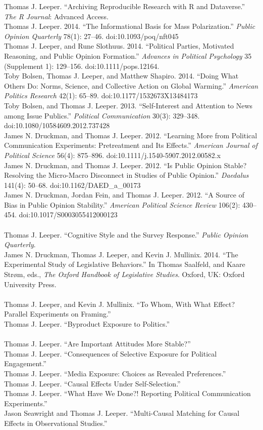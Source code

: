 \documentclass[12pt]{article}
\renewcommand{\section}[1]{\pagebreak[3]%
    \llap{\scshape\smash{\parbox[t]{\marginparwidth}{\raggedright {\color{lg}#1}}}}%
    \vspace{-\baselineskip}\par}
\newcommand{\topic}[1]{\pagebreak[3]\indent {\color{lg}{\footnotesize #1 }}\\}
\newcommand{\entry}[1]{\indent {\color{lg}\guillemotright}\hspace{2pt}#1\vspace{.25em}\\}
\begin{document}
\section{Peer-Reviewed Publications}
\entry{Thomas J. Leeper. ``Archiving Reproducible Research with R and Dataverse.'' {\em The R Journal}: Advanced Access.}
\entry{Thomas J. Leeper. 2014. ``The Informational Basis for Mass Polarization.'' {\em Public Opinion Quarterly} 78(1): 27--46. doi:10.1093/poq/nft045}
\entry{Thomas J. Leeper, and Rune Slothuus. 2014. ``Political Parties, Motivated Reasoning, and Public Opinion Formation.'' {\em Advances in Political Psychology} 35 (Supplement 1): 129--156. doi:10.1111/pops.12164.}
\entry{Toby Bolsen, Thomas J. Leeper, and Matthew Shapiro. 2014. ``Doing What Others Do: Norms, Science, and Collective Action on Global Warming.'' {\em American Politics Research} 42(1): 65--89. doi:10.1177/1532673X13484173}
\entry{Toby Bolsen, and Thomas J. Leeper. 2013. ``Self-Interest and Attention to News among Issue Publics.'' {\em Political Communication} 30(3): 329--348.\\ doi:10.1080/10584609.2012.737428}
\entry{James N. Druckman, and Thomas J. Leeper. 2012. ``Learning More from Political Communication Experiments: Pretreatment and Its Effects.'' {\em American Journal of Political Science} 56(4): 875--896. doi:10.1111/j.1540-5907.2012.00582.x}
\entry{James N. Druckman, and Thomas J. Leeper. 2012. ``Is Public Opinion Stable? Resolving the Micro-Macro Disconnect in Studies of Public Opinion.'' {\em Daedalus} 141(4): 50--68. doi:10.1162/DAED\_a\_00173}
\entry{James N. Druckman, Jordan Fein, and Thomas J. Leeper. 2012. ``A Source of Bias in Public Opinion Stability.'' {\em American Political Science Review} 106(2): 430--454. doi:10.1017/S0003055412000123}

\topic{Forthcoming}
\entry{Thomas J. Leeper. ``Cognitive Style and the Survey Response.'' {\em Public Opinion Quarterly}.}
\entry{James N. Druckman, Thomas J. Leeper, and Kevin J. Mullinix. 2014. ``The Experimental Study of Legislative Behaviors.'' In Thomas Saalfeld, and Kaare Str\o m, eds., {\em The Oxford Handbook of Legislative Studies}. Oxford, UK: Oxford University Press.}

\topic{Under Review}
\entry{Thomas J. Leeper, and Kevin J. Mullinix. ``To Whom, With What Effect? Parallel Experiments on Framing.''}
\entry{Thomas J. Leeper. ``Byproduct Exposure to Politics.''}

\topic{Working Papers and Ongoing Projects}
\entry{Thomas J. Leeper. ``Are Important Attitudes More Stable?''}
\entry{Thomas J. Leeper. ``Consequences of Selective Exposure for Political Engagement.''}
\entry{Thomas J. Leeper. ``Media Exposure: Choices as Revealed Preferences.''}
\entry{Thomas J. Leeper. ``Causal Effects Under Self-Selection.''}
\entry{Thomas J. Leeper. ``What Have We Done?! Reporting Political Communication Experiments.''}
\entry{Jason Seawright and Thomas J. Leeper. ``Multi-Causal Matching for Causal Effects in Observational Studies.''}
\end{document}
